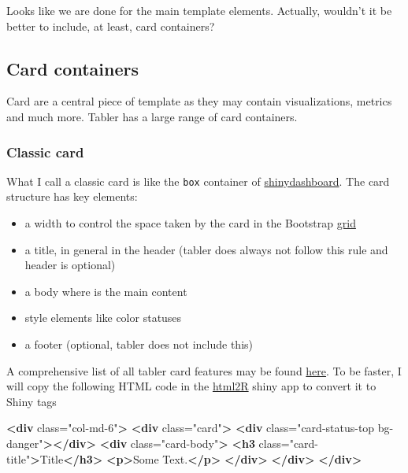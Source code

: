 \documentclass[]{book}
\newenvironment{Shaded}{\begin{snugshade}}{\end{snugshade}}
\newcommand{\KeywordTok}[1]{\textcolor[rgb]{0.13,0.29,0.53}{\textbf{#1}}}
\newcommand{\NormalTok}[1]{#1}
\newcommand{\OtherTok}[1]{\textcolor[rgb]{0.56,0.35,0.01}{#1}}
\newcommand{\StringTok}[1]{\textcolor[rgb]{0.31,0.60,0.02}{#1}}
\providecommand{\tightlist}{%
  \setlength{\itemsep}{0pt}\setlength{\parskip}{0pt}}
\begin{document}
Looks like we are done for the main template elements. Actually, wouldn't it be better to include, at least, card containers?

\hypertarget{card-containers}{%
\subsection{Card containers}\label{card-containers}}

Card are a central piece of template as they may contain visualizations, metrics and much more. Tabler has a large range of card containers.

\hypertarget{classic-card}{%
\subsubsection{Classic card}\label{classic-card}}

What I call a classic card is like the \texttt{box} container of \href{https://rstudio.github.io/shinydashboard/structure.html}{shinydashboard}. The card structure has key elements:

\begin{itemize}
\tightlist
\item
  a width to control the space taken by the card in the Bootstrap \href{https://getbootstrap.com/docs/4.0/layout/grid/}{grid}
\item
  a title, in general in the header (tabler does always not follow this rule and header is optional)
\item
  a body where is the main content
\item
  style elements like color statuses
\item
  a footer (optional, tabler does not include this)
\end{itemize}

A comprehensive list of all tabler card features may be found \href{https://preview-dev.tabler.io/docs/cards.html}{here}. To be faster, I will copy the following HTML code in the \href{}{html2R} shiny app to convert it to Shiny tags

\begin{Shaded}
\begin{Highlighting}[]
\KeywordTok{<div}\OtherTok{ class=}\StringTok{"col-md-6"}\KeywordTok{>}
  \KeywordTok{<div}\OtherTok{ class=}\StringTok{"card"}\KeywordTok{>}
    \KeywordTok{<div}\OtherTok{ class=}\StringTok{"card-status-top bg-danger"}\KeywordTok{></div>}
    \KeywordTok{<div}\OtherTok{ class=}\StringTok{"card-body"}\KeywordTok{>}
      \KeywordTok{<h3}\OtherTok{ class=}\StringTok{"card-title"}\KeywordTok{>}\NormalTok{Title}\KeywordTok{</h3>}
      \KeywordTok{<p>}\NormalTok{Some Text.}\KeywordTok{</p>}
    \KeywordTok{</div>}
  \KeywordTok{</div>}
\KeywordTok{</div>}
\end{Highlighting}
\end{Shaded}
\end{document}
